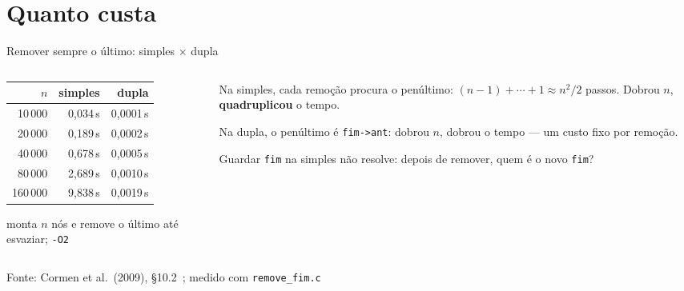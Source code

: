 \documentclass[aspectratio=169]{beamer}
\newcommand{\fonte}[1]{\vfill\hfill{\scriptsize\textcolor{UFSGray}{Fonte: #1}}}
\begin{document}
\section{Quanto custa}

\begin{frame}{Remover sempre o último: simples $\times$ dupla}
  \begin{columns}[c]
    \begin{column}{0.5\textwidth}
      \begin{center}
      \small
      \begin{tabular}{@{}rrr@{}}
        \toprule
        $n$ & simples & dupla\\
        \midrule
        10\,000  & 0,034\,s & 0,0001\,s\\
        20\,000  & 0,189\,s & 0,0002\,s\\
        40\,000  & 0,678\,s & 0,0005\,s\\
        80\,000  & 2,689\,s & 0,0010\,s\\
        160\,000 & 9,838\,s & 0,0019\,s\\
        \bottomrule
      \end{tabular}

      \medskip
      \scriptsize monta $n$ nós e remove o último até esvaziar; \texttt{-O2}
      \end{center}
    \end{column}
    \begin{column}{0.46\textwidth}
      \small
      Na simples, cada remoção procura o penúltimo:
      $(n-1) + \cdots + 1 \approx n^2/2$ passos. Dobrou $n$,
      \textbf{quadruplicou} o tempo.

      \medskip
      Na dupla, o penúltimo é \texttt{fim->ant}: dobrou $n$, dobrou o
      tempo --- um custo fixo por remoção.

      \medskip
      Guardar \texttt{fim} na simples não resolve: depois de remover, quem
      é o novo \texttt{fim}?
    \end{column}
  \end{columns}
  \fonte{Cormen et al.\ (2009), §10.2~\cite{cormen2009introduction};
    medido com \texttt{remove\_fim.c}}
\end{frame}
\end{document}
